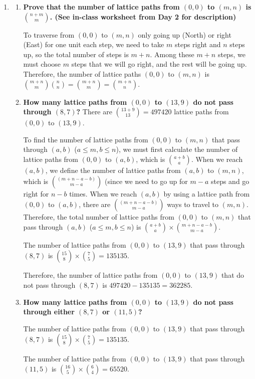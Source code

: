 \documentclass[10pt]{article}
\begin{document}
\begin{enumerate}
\vskip 1cm


\item
\begin{enumerate}
\item
\textbf{Prove that the number of lattice paths from $(0,0)$ to $(m,n)$ is $\binom{n+m}{m}$.  (See in-class worksheet from Day 2 for description)}

To traverse from $(0,0)$ to $(m,n)$ only going up (North) or right (East) for one unit each step, we need to take $m$ steps right and $n$ steps up, so the total number of steps is $m + n$. Among these $m+n$ steps, we must choose $m$ steps that we will go right, and the rest will be going up. Therefore, the number of lattice paths $(0,0)$ to $(m,n)$ is $\binom{m+n}{m}\binom{n}{n}=\binom{m+n}{m}=\binom{m+n}{n}$.
\item
\textbf{How many lattice paths from $(0,0)$ to $(13,9)$ do not pass through $(8,7)$?}
There are $\binom{13+9}{13} = 497420$ lattice paths from $(0,0)$ to $(13,9)$. 

To find the number of lattice paths from $(0,0)$ to $(m,n)$ that pass through $(a, b)$ ($a \leq m, b \leq n$), we must first calculate the number of lattice paths from $(0,0)$ to $(a,b)$, which is $\binom{a+b}{a}$. When we reach $(a,b)$, we define the number of lattice paths from $(a,b)$ to $(m,n)$, which is $\binom{(m + n - a - b)}{m - a}$ (since we need to go up for $m -a$ steps and go right for $n - b$ times. When we reach $(a,b)$ by using a lattice path from $(0,0)$ to $(a,b)$, there are $\binom{(m + n - a - b)}{m - a}$ ways to travel to $(m,n)$. Therefore, the total number of lattice paths from $(0,0)$ to $(m,n)$ that pass through $(a, b)$ ($a \leq m, b \leq n$) is $\binom{a+b}{a} \times 
\binom{m + n - a - b}{m - a}$.

The number of lattice paths from $(0,0)$ to $(13, 9)$ that pass through $(8, 7)$ is $\binom{15}{8} \times \binom{7}{5} = 135135$.

Therefore, the number of lattice paths from $(0,0)$ to $(13, 9)$ that do not pass through $(8, 7)$ is $497420 - 135135 = 362285$.

\item
\textbf{How many lattice paths from $(0,0)$ to $(13,9)$ do not pass through either $(8,7)$ or $(11,5)$?}

The number of lattice paths from $(0,0)$ to $(13, 9)$ that pass through $(8, 7)$ is $\binom{15}{8} \times \binom{7}{5} = 135135$.

The number of lattice paths from $(0,0)$ to $(13, 9)$ that pass through $(11,5)$ is $\binom{16}{5} \times \binom{6}{4} = 65520$.


\end{enumerate}
\end{enumerate}
\end{document}
